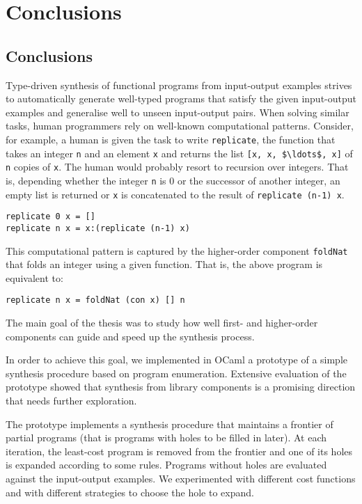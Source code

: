 \chapter{Conclusions} \label{ch:conclusions}

\section{Conclusions}

Type-driven synthesis of functional programs from input-output examples   strives to automatically generate well-typed programs that satisfy the given input-output examples and generalise well to unseen input-output pairs. When solving similar tasks, human programmers rely on well-known computational patterns. Consider, for example, a human is given the task to write \lstinline!replicate!, the function that takes an integer \lstinline!n! and an element \lstinline!x! and returns the list \lstinline![x, x, $\ldots$, x]! of \lstinline!n! copies of \lstinline!x!. The human would probably resort to recursion over integers. That is, depending whether the integer \lstinline!n! is $0$ or the successor of another integer, an empty list is returned or \lstinline!x! is concatenated to the result of \lstinline!replicate (n-1) x!.
\begin{lstlisting}[style=plain]
replicate 0 x = []
replicate n x = x:(replicate (n-1) x)
\end{lstlisting}
This computational pattern is captured by the higher-order component \lstinline!foldNat! that folds an integer using a given function. That is, the above program is equivalent to:
\begin{lstlisting}[style=plain]
replicate n x = foldNat (con x) [] n
\end{lstlisting}

The main goal of the thesis was to study how well first- and higher-order components can guide and speed up the synthesis process.

In order to achieve this goal, we implemented in OCaml a prototype of a simple synthesis procedure based on program enumeration. Extensive evaluation of the prototype showed that synthesis from library components is a promising direction that needs further exploration.

The prototype implements a synthesis procedure that maintains a frontier of partial programs (that is programs with holes to be filled in later). At each iteration, the least-cost program is removed from the frontier and one of its holes is expanded according to some rules. Programs without holes are evaluated against the input-output examples. We experimented with different cost functions and with different strategies to choose the hole to expand.

